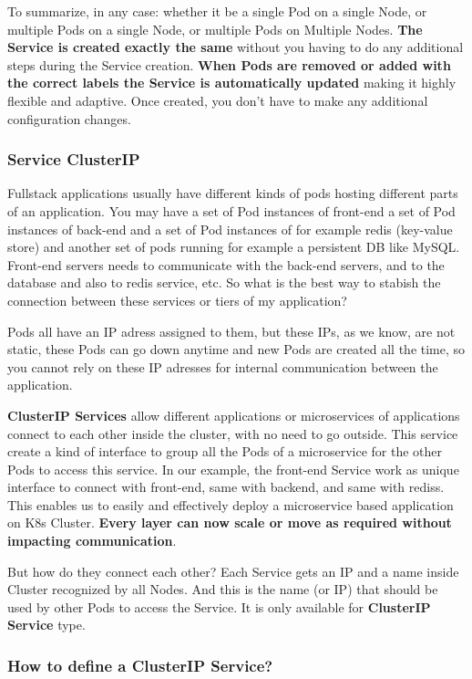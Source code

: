 \documentclass{article}
\begin{document}
To summarize, in any case: whether it be a single Pod on a single Node, or multiple Pods on a single Node, or multiple Pods on Multiple Nodes. \textbf{The Service is created exactly the same} without you having to do any additional steps during the Service creation. \textbf{When Pods are removed or added with the correct labels the Service is automatically updated} making it highly flexible and adaptive. Once created, you don't have to make any additional configuration changes.

\subsubsection{Service ClusterIP}

Fullstack applications usually have different kinds of pods hosting different parts of an application. You may have a set of Pod instances of front-end a set of Pod instances of back-end and a set of Pod instances of for example redis (key-value store) and another set of pods running for example a persistent DB like MySQL. Front-end servers needs to communicate with the back-end servers, and to the database and also to redis service, etc. So what is the best way to stabish the connection between these services or tiers of my application? 

Pods all have an IP adress assigned to them, but these IPs, as we know, are not static, these Pods can go down anytime and new Pods are created all the time, so you cannot rely on these IP adresses for internal communication between the application.

\textbf{ClusterIP Services} allow different applications or microservices of applications connect to each other inside the cluster, with no need to go outside. This service create a kind of interface to group all the Pods of a microservice for the other Pods to access this service. In our example, the front-end Service work as unique interface to connect with front-end, same with backend, and same with rediss. This enables us to easily and effectively deploy a microservice based application on K8s Cluster. \textbf{Every layer can now scale or move as required without impacting communication}.

But how do they connect each other? Each Service gets an IP and a name inside Cluster recognized by all Nodes. And this is the name (or IP) that should be used by other Pods to access the Service. It is only available for \textbf{ClusterIP Service} type.

\subsubsection{How to define a ClusterIP Service?}
\end{document}
